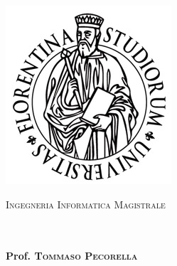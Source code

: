 \documentclass[
12pt, %
english, %
singlespacing, %
headsepline, %
]{notes_class} %
\author{Paula \textsc{Mihalcea}} %
\begin{document}
\normalem

\frontmatter %

\pagestyle{plain} %


\begin{titlepage}
\begin{center}

\includegraphics[scale=0.6]{img/logo.jpg} %

{\scshape\LARGE \univname\par}\vspace{1.5cm} %
\textsc{\Large Ingegneria Informatica Magistrale}\\[0.5cm] %

\HRule \\[0.4cm] %
{\huge \bfseries \ttitle
\vspace*{0.3cm}
\\ \large Prof. \textsc{Tommaso Pecorella}\par}\vspace{0.4cm} %
\HRule \\[1.5cm] %

%


\end{center}
\end{titlepage}
\end{document}

